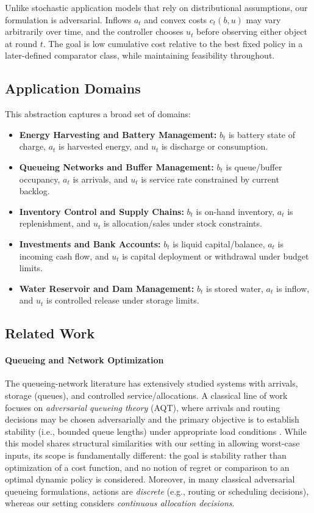 \documentclass[11pt]{article}
\begin{document}
Unlike stochastic application models that rely on distributional assumptions, our formulation is adversarial. Inflows $a_t$ and convex costs $c_t(b, u)$ may vary arbitrarily over time, and the controller chooses $u_t$ before observing either object at round $t$. The goal is low cumulative cost relative to the best fixed policy in a later-defined comparator class, while maintaining feasibility throughout.

\subsection{Application Domains}
This abstraction captures a broad set of domains:
\begin{itemize}
    \item \textbf{Energy Harvesting and Battery Management:} $b_t$ is battery state of charge, $a_t$ is harvested energy, and $u_t$ is discharge or consumption.
    \item \textbf{Queueing Networks and Buffer Management:} $b_t$ is queue/buffer occupancy, $a_t$ is arrivals, and $u_t$ is service rate constrained by current backlog.
    \item \textbf{Inventory Control and Supply Chains:} $b_t$ is on-hand inventory, $a_t$ is replenishment, and $u_t$ is allocation/sales under stock constraints.
    \item \textbf{Investments and Bank Accounts:} $b_t$ is liquid capital/balance, $a_t$ is incoming cash flow, and $u_t$ is capital deployment or withdrawal under budget limits.
    \item \textbf{Water Reservoir and Dam Management:} $b_t$ is stored water, $a_t$ is inflow, and $u_t$ is controlled release under storage limits.
\end{itemize}


\subsection{Related Work}
\paragraph{Queueing and Network Optimization}
The queueing-network literature has extensively studied systems with arrivals, storage (queues), and controlled service/allocations. A classical line of work focuses on \emph{adversarial queueing theory} (AQT), where arrivals and routing decisions may be chosen adversarially and the primary objective is to establish stability (i.e., bounded queue lengths) under appropriate load conditions \cite{borodin2001adversarial, gamarnik1998stability, kiwi2005survey}. While this model shares structural similarities with our setting in allowing worst-case inputs, its scope is fundamentally different: the goal is stability rather than optimization of a cost function, and no notion of regret or comparison to an optimal dynamic policy is considered. Moreover, in many classical adversarial queueing formulations, actions are \emph{discrete} (e.g., routing or scheduling decisions), whereas our setting considers \emph{continuous allocation decisions}.
\end{document}
